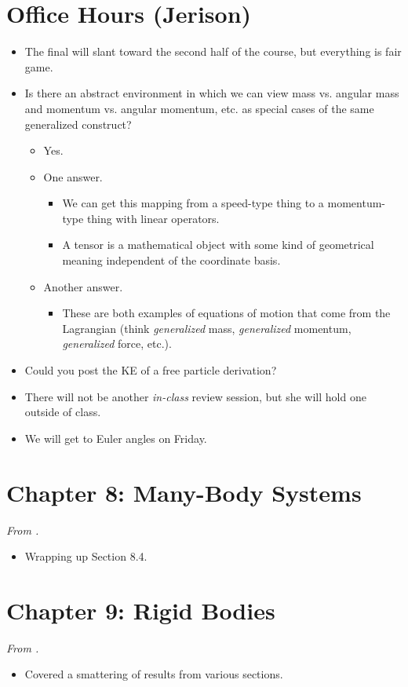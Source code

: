 \documentclass[../notes.tex]{subfiles}
\begin{document}
\section{Office Hours (Jerison)}
\begin{itemize}
    \item {}The final will slant toward the second half of the course, but everything is fair game.
    \item Is there an abstract environment in which we can view mass vs. angular mass and momentum vs. angular momentum, etc. as special cases of the same generalized construct?
    \begin{itemize}
        \item Yes.
        \item One answer.
        \begin{itemize}
            \item We can get this mapping from a speed-type thing to a momentum-type thing with linear operators.
            \item A tensor is a mathematical object with some kind of geometrical meaning independent of the coordinate basis.
        \end{itemize}
        \item Another answer.
        \begin{itemize}
            \item These are both examples of equations of motion that come from the Lagrangian (think \emph{generalized} mass, \emph{generalized} momentum, \emph{generalized} force, etc.).
        \end{itemize}
    \end{itemize}
    \item Could you post the KE of a free particle derivation?
    \item There will not be another \emph{in-class} review session, but she will hold one outside of class.
    \item We will get to Euler angles on Friday.
\end{itemize}



\section{Chapter 8: Many-Body Systems}
\emph{From \textcite{bib:KibbleBerkshire}.}
\begin{itemize}
    \item {}Wrapping up Section 8.4.
\end{itemize}



\section{Chapter 9: Rigid Bodies}
\emph{From \textcite{bib:KibbleBerkshire}.}
\begin{itemize}
    \item Covered a smattering of results from various sections.
\end{itemize}
\end{document}
